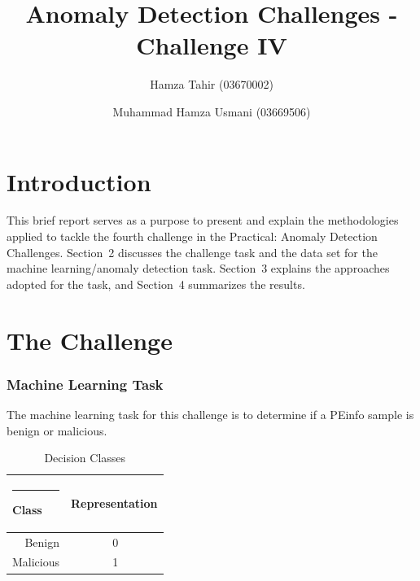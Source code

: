 \documentclass{llncs}
\begin{document}
%
\frontmatter          %
%
\pagestyle{headings}  %

\mainmatter              %
%
\title{Anomaly Detection Challenges - Challenge IV}
%

%
\author{Hamza Tahir (03670002) \and Muhammad Hamza Usmani (03669506)}
%
%

\maketitle              %


%
\section{Introduction}
%
This brief report serves as a purpose to present and explain the methodologies applied to tackle the fourth challenge in the Practical: Anomaly Detection Challenges. Section~2 discusses the challenge task and the data set for the machine learning/anomaly detection task. Section~3 explains the approaches adopted for the task, and Section~4 summarizes the results.
%
\section{The Challenge}
%
%
\subsubsection{Machine Learning Task}
%
The machine learning task for this challenge is to determine if a PEinfo sample is benign or malicious.
\begin{table}
\caption{Decision Classes}
\begin{center}
\begin{tabular}{r@{\quad}rl}
\hline
\multicolumn{1}{l}{\rule{2pt}{0pt}
Class}&\multicolumn{2}{l}{Representation}\\[2pt]
\hline\rule{0pt}{12pt}
Benign&    0& \\
Malicious&     1& \\[2pt]
\hline
\end{tabular}
\end{center}
\end{table}
%
\end{document}
